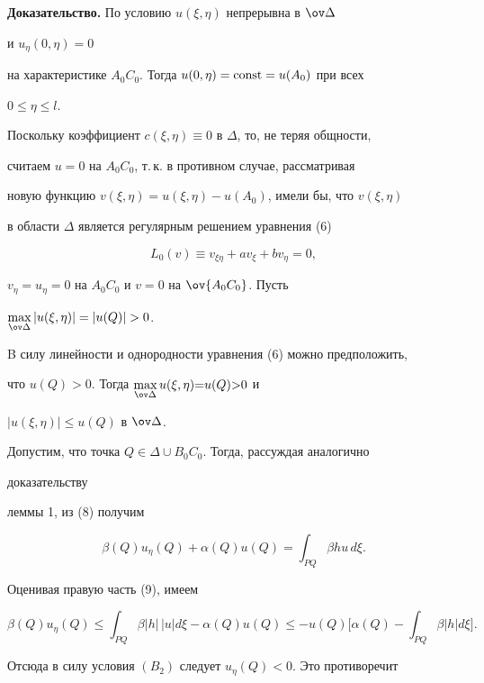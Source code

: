  


{\bf Доказательство.} По условию $u(\xi,\eta)$ непрерывна в $\ov\Delta$ 


и $u_\eta(0,\eta)=0$ 


на характеристике $A_0C_0$. Тогда $u(0,\eta)=\operatorname{const}=u(A_0)$ при всех 


$0\le\eta\le l$. 


Поскольку коэффициент $c(\xi,\eta)\equiv0$ в $\Delta$, то, не теряя общности, 


считаем $u=0$ на $A_0C_0$, т.\,к. в противном случае, рассматривая 


новую функцию $v(\xi,\eta)=u(\xi,\eta)-u(A_0)$, имели бы, что $v(\xi,\eta)$


в области $\Delta$ является регулярным решением уравнения (6) 


$$ 


L_0(v)\equiv v_{\xi\eta}+a v_\xi+b v_\eta=0, 


$$ 


$v_\eta=u_\eta=0$ на $A_0C_0$ и $v=0$ на $\ov{A_0C_0}$. Пусть 


$\max\limits_{\ov\Delta}|u(\xi,\eta)|=|u(Q)|>0$. 


B силу линейности и однородности уравнения (6) можно предположить, 


что $u(Q)>0$. Тогда $\max\limits_{\ov\Delta}u(\xi,\eta){=}u(Q){>}0$ и 


$|u(\xi,\eta)|\le u(Q)$ в $\ov\Delta$. 


Допустим, что точка $Q\in \Delta\cup B_0C_0$. Тогда, рассуждая аналогично 


доказательству 


леммы 1, из (8) получим 


\begin{equation} 


\beta(Q)u_\eta(Q)+\alpha(Q)u(Q)=\int_{P Q}\beta h u\,d\xi. 


\end{equation} 


Оценивая правую часть (9), имеем 


$$ 


\beta(Q)u_\eta(Q)\le\int_{P Q}\beta|h|\,|u|d\xi- 


\alpha(Q)u(Q)\le-u(Q)\bigg[\alpha(Q)-\int_{P Q} 


\beta|h|d\xi\bigg]. 


$$ 


Отсюда в силу условия $(B_2)$ следует $u_\eta(Q)<0$. Это противоречит 


